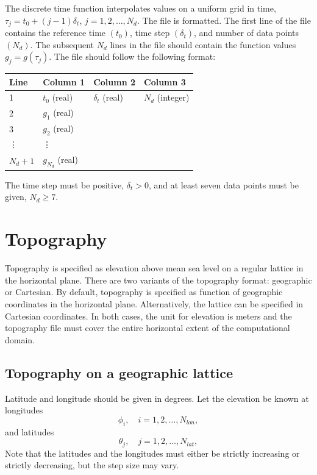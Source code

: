 \documentclass[11pt]{report}
\begin{document}
{The discrete time function interpolates values on a uniform grid in time, $\tau_j = t_0 +
	(j-1)\delta_t$, $j=1,2,\ldots,N_d$. The file is formatted. The first line of the file contains the
reference time $(t_0)$, time step $(\delta_t)$, and number of data points $(N_d)$. The subsequent
$N_d$ lines in the file should contain the function values $g_j = g(\tau_j)$. The file should follow
the following format:
\begin{center}
	\begin{tabular}{llll}\hline
		Line      & Column 1         & Column 2          & Column 3        \\ \hline
		1         & $t_0$ (real)     & $\delta_t$ (real) & $N_d$ (integer) \\ \hline
		2         & $g_1$ (real)     &                   &                 \\ \hline
		3         & $g_2$ (real)     &                   &                 \\ \hline
		\vdots    & \vdots           &                   &                 \\ \hline
		$N_d + 1$ & $g_{N_d}$ (real) &                   &                 \\ \hline
	\end{tabular}
\end{center}
The time step must be positive, $\delta_t>0$, and at least seven data points must be given, $N_d\geq
	7$.

\section{Topography}\label{sec:topo-file-format}

Topography is specified as elevation above mean sea level on a regular lattice in the horizontal
plane. There are two variants of the topography format: geographic or Cartesian. By default,
topography is specified as function of geographic coordinates in the horizontal
plane. Alternatively, the lattice can be specified in Cartesian coordinates. In both cases, the unit
for elevation is meters and the topography file must cover the entire horizontal extent of the
computational domain.

\subsection{Topography on a geographic lattice}
Latitude and longitude should be given in degrees. Let the elevation be known at longitudes
\[
	\phi_i,\quad i=1,2,\ldots,N_{lon},
\]
and latitudes
\[
	\theta_j,\quad j=1,2,\ldots,N_{lat},
\]
Note that the latitudes and the longitudes must either be strictly increasing or strictly
decreasing, but the step size may vary.

}
\end{document}
